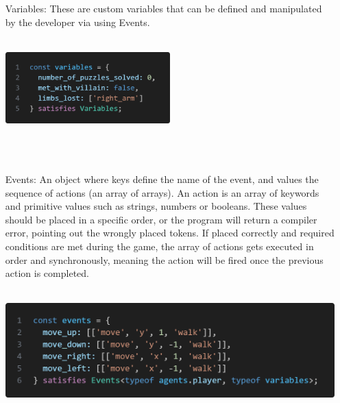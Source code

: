 \documentclass{article}
\begin{document}
\begin{itemize}
    \item[Variables:] These are custom variables that can be defined and manipulated by the developer via using Events.\\\\
    \begin{minipage}{\linewidth}
        \centering
        \includegraphics[width=0.5\textwidth]{variables.png}
    \end{minipage}\\\\
    
    \item[Events:] An object where keys define the name of the event, and values the sequence of actions (an array of arrays). An action is an array of keywords and primitive values such as strings, numbers or booleans. These values should be placed in a specific order, or the program will return a compiler error, pointing out the wrongly placed tokens. If placed correctly and required conditions are met during the game, the array of actions gets executed in order and synchronously, meaning the action will be fired once the previous action is completed.\\\\ 
        \begin{minipage}{\linewidth}
        \centering
        \includegraphics[width=1\textwidth]{events.png}
    \end{minipage}\\\\
    

\end{itemize}
\end{document}

